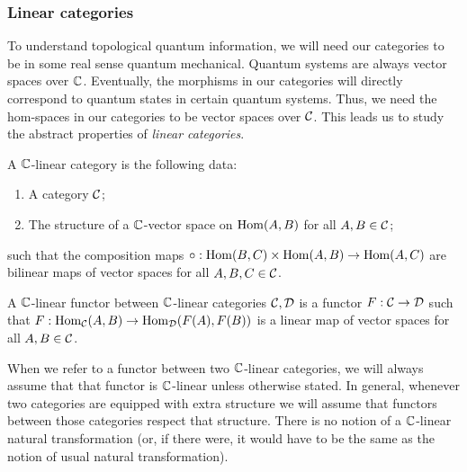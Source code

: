 \subsubsection{Linear categories}


To understand topological quantum information, we will need our categories to be in some real sense quantum mechanical. Quantum systems are always vector spaces over ${\mathbb C}$. Eventually, the morphisms in our categories will directly correspond to quantum states in certain quantum systems. Thus, we need the hom-spaces in our categories to be vector spaces over ${\mathcal C}$. This leads us to study the abstract properties of {\em linear categories}.

\begin{defn} A ${\mathbb C}$-linear category is the following data:

\begin{enumerate}
\item A category ${\mathcal C}$;
\item The structure of a ${\mathbb C}$-vector space on $\operatorname{Hom}(A,B)$ for all $A,B\in {\mathcal C}$;

\end{enumerate}

such that the composition maps $\circ:\operatorname{Hom}(B,C)\times \operatorname{Hom}(A,B)\to \operatorname{Hom}(A,C)$ are bilinear maps of vector spaces for all $A,B,C\in {\mathcal C}$.
\end{defn}

\begin{defn} A ${\mathbb C}$-linear functor between ${\mathbb C}$-linear categories ${\mathcal C},{\mathcal D}$ is a functor $F:{\mathcal C}\to{\mathcal D}$ such that $F:\operatorname{Hom}_{\mathcal C}(A,B)\to\operatorname{Hom}_{\mathcal D}(F(A),F(B))$ is a linear map of vector spaces for all $A,B\in{\mathcal C}$.
\end{defn}

\begin{rem} When we refer to a functor between two ${\mathbb C}$-linear categories, we will always assume that that functor is ${\mathbb C}$-linear unless otherwise stated. In general, whenever two categories are equipped with extra structure we will assume that functors between those categories respect that structure. There is no notion of a ${\mathbb C}$-linear natural transformation (or, if there were, it would have to be the same as the notion of usual natural transformation).
\end{rem}

